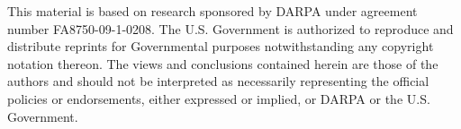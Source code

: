 \documentclass[12pt,letterpaper]{report}
\begin{document}
This material is based on research sponsored by DARPA under agreement number 
FA8750-09-1-0208. The U.S. Government is authorized to reproduce and distribute 
reprints for Governmental purposes notwithstanding any copyright notation 
thereon. The views and conclusions contained herein are those of the authors and
should not be interpreted as necessarily representing the official policies or 
endorsements, either expressed or implied, or DARPA or the U.S. Government.
  
\afteracknowledgementsp












\bibliographyp




\appendixpages       %
%
\end{document}
